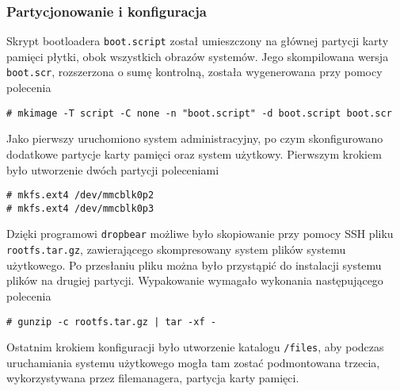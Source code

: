 \documentclass[10pt,a4paper]{article}
\begin{document}
\subsubsection{Partycjonowanie i konfiguracja}
Skrypt bootloadera \texttt{boot.script} został umieszczony na głównej partycji karty pamięci płytki, obok wszystkich obrazów systemów. Jego skompilowana wersja \texttt{boot.scr}, rozszerzona o sumę kontrolną, została wygenerowana przy pomocy polecenia
\begin{lstlisting}[style=bash, commentstyle=\color{black}]
# mkimage -T script -C none -n "boot.script" -d boot.script boot.scr
\end{lstlisting}
Jako pierwszy uruchomiono system administracyjny, po czym skonfigurowano dodatkowe partycje karty pamięci oraz system użytkowy. Pierwszym krokiem było utworzenie dwóch partycji poleceniami
\begin{lstlisting}[style=bash, commentstyle=\color{black}]
# mkfs.ext4 /dev/mmcblk0p2
# mkfs.ext4 /dev/mmcblk0p3
\end{lstlisting}
Dzięki programowi \texttt{dropbear} możliwe było skopiowanie przy pomocy SSH pliku \texttt{rootfs.tar.gz}, zawierającego skompresowany system plików systemu użytkowego. Po przesłaniu pliku można było przystąpić do instalacji systemu plików na drugiej partycji. Wypakowanie wymagało wykonania następującego polecenia
\begin{lstlisting}[style=bash, commentstyle=\color{black}]
# gunzip -c rootfs.tar.gz | tar -xf -
\end{lstlisting}
Ostatnim krokiem konfiguracji było utworzenie katalogu \texttt{/files}, aby podczas uruchamiania systemu użytkowego mogła tam zostać podmontowana trzecia, wykorzystywana przez filemanagera, partycja karty pamięci.
\end{document}
